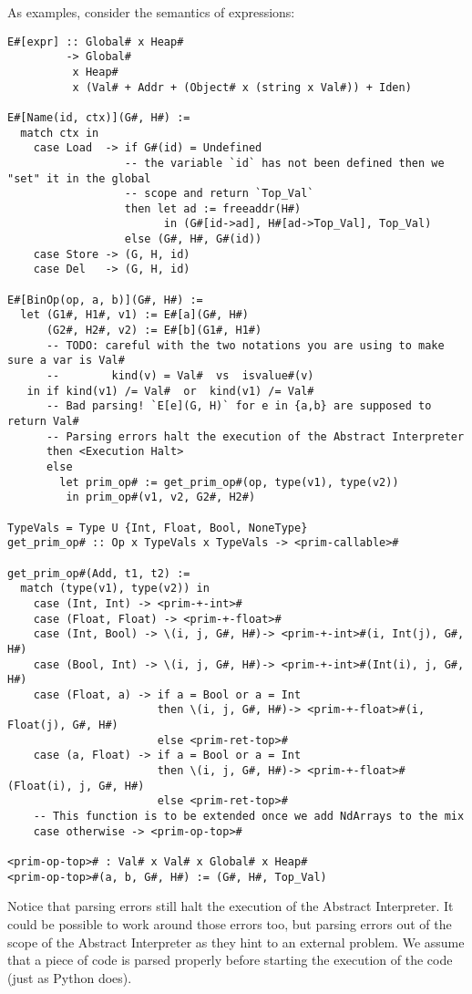 As examples, consider the semantics of expressions:

\begin{verbatim}
E#[expr] :: Global# x Heap#
         -> Global#
          x Heap#
          x (Val# + Addr + (Object# x (string x Val#)) + Iden)

E#[Name(id, ctx)](G#, H#) :=
  match ctx in
    case Load  -> if G#(id) = Undefined
                  -- the variable `id` has not been defined then we "set" it in the global
                  -- scope and return `Top_Val`
                  then let ad := freeaddr(H#)
                        in (G#[id->ad], H#[ad->Top_Val], Top_Val)
                  else (G#, H#, G#(id))
    case Store -> (G, H, id)
    case Del   -> (G, H, id)

E#[BinOp(op, a, b)](G#, H#) :=
  let (G1#, H1#, v1) := E#[a](G#, H#)
      (G2#, H2#, v2) := E#[b](G1#, H1#)
      -- TODO: careful with the two notations you are using to make sure a var is Val#
      --        kind(v) = Val#  vs  isvalue#(v)
   in if kind(v1) /= Val#  or  kind(v1) /= Val#
      -- Bad parsing! `E[e](G, H)` for e in {a,b} are supposed to return Val#
      -- Parsing errors halt the execution of the Abstract Interpreter
      then <Execution Halt>
      else
        let prim_op# := get_prim_op#(op, type(v1), type(v2))
         in prim_op#(v1, v2, G2#, H2#)

TypeVals = Type U {Int, Float, Bool, NoneType}
get_prim_op# :: Op x TypeVals x TypeVals -> <prim-callable>#

get_prim_op#(Add, t1, t2) :=
  match (type(v1), type(v2)) in
    case (Int, Int) -> <prim-+-int>#
    case (Float, Float) -> <prim-+-float>#
    case (Int, Bool) -> \(i, j, G#, H#)-> <prim-+-int>#(i, Int(j), G#, H#)
    case (Bool, Int) -> \(i, j, G#, H#)-> <prim-+-int>#(Int(i), j, G#, H#)
    case (Float, a) -> if a = Bool or a = Int
                       then \(i, j, G#, H#)-> <prim-+-float>#(i, Float(j), G#, H#)
                       else <prim-ret-top>#
    case (a, Float) -> if a = Bool or a = Int
                       then \(i, j, G#, H#)-> <prim-+-float>#(Float(i), j, G#, H#)
                       else <prim-ret-top>#
    -- This function is to be extended once we add NdArrays to the mix
    case otherwise -> <prim-op-top>#

<prim-op-top># : Val# x Val# x Global# x Heap#
<prim-op-top>#(a, b, G#, H#) := (G#, H#, Top_Val)
\end{verbatim}

Notice that parsing errors still halt the execution of the Abstract
Interpreter. It could be possible to work around those errors too, but
parsing errors out of the scope of the Abstract Interpreter as they hint
to an external problem. We assume that a piece of code is parsed
properly before starting the execution of the code (just as Python
does).


